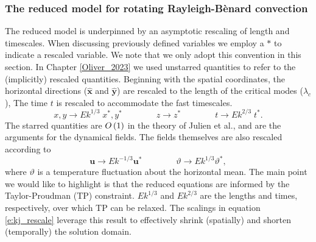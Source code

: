 \subsubsection*{The reduced model for rotating Rayleigh-B\`enard convection}
\label{s:red_mod}
The reduced model is underpinned by an asymptotic rescaling of length and timescales. When discussing previously defined variables we employ a $*$ to indicate a rescaled variable. We note that we only adopt this convention in this section. In Chapter \ref{Oliver_2023} we used unstarred quantities to refer to the (implicitly) rescaled quantities. Beginning with the spatial coordinates, the horizontal directions ($\hat{\mathbf{x}}$ and $\hat{\mathbf{y}}$) are rescaled to the length of the critical modes ($\lambda_{c}$),
The time $t$ is rescaled to accommodate the fast timescales.
\begin{equation}
x,y \rightarrow Ek^{1/3}\; x^{*},y^{*}\qquad \qquad  z\rightarrow z^{*}\qquad\qquad t \rightarrow Ek^{2/3} \;t^{*}.
	\label{e:kj_rescale}
\end{equation}
The starred quantities are $O\left ( 1\right ) $ in the theory of Julien et al., and are the arguments for the dynamical fields. 
The fields themselves are also rescaled according to
\[\mathbf{u} \rightarrow Ek^{-1/3}\mathbf{u}^{*}\qquad\qquad \vartheta \rightarrow Ek^{1/3}\vartheta^{*},\]
where $\vartheta$ is a temperature fluctuation about the horizontal mean.
The main point we would like to highlight is that the reduced equations are informed by the Taylor-Proudman (TP) constraint. $Ek^{1/3}$ and $Ek^{2/3}$ are the lengths and times, respectively, over which TP can be relaxed. 
The scalings in equation \eqref{e:kj_rescale} leverage this result to effectively shrink (spatially) and shorten (temporally) the solution domain.


